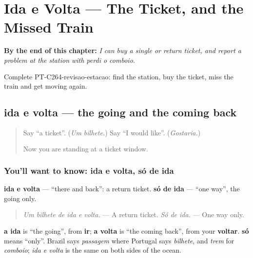 
\chapter{Ida e Volta --- The Ticket, and the Missed Train}
\label{ch:pt-the-ticket-and-the-missed-train}

\begin{chapteropening}
\textbf{By the end of this chapter:} \emph{I can buy a single or return ticket, and report a problem at the station with perdi o comboio.}

Complete PT-C264-revisao-estacao: find the station, buy the ticket, miss the train and get moving again.
\end{chapteropening}

\section[ida e volta, só de ida]{ida e volta — the going and the coming back}

\label{lesson:PT-C264-ida-e-volta}



\begin{quote}
Say \textquotedblleft{}a ticket\textquotedblright{}. (\emph{Um bilhete.}) Say \textquotedblleft{}I would like\textquotedblright{}. (\emph{Gostaria.})

Now you are standing at a ticket window.
\end{quote}

\subsection*{You'll want to know: ida e volta, só de ida}
\textbf{ida e volta} — \textquotedblleft{}there and back\textquotedblright{}: a return ticket. \textbf{só de ida} — \textquotedblleft{}one way\textquotedblright{}, the going only.

\begin{quote}
\emph{Um bilhete de ida e volta.} — A return ticket. \emph{Só de ida.} — One way only.
\end{quote}

\textbf{a ida} is \textquotedblleft{}the going\textquotedblright{}, from \textbf{ir}; \textbf{a volta} is \textquotedblleft{}the coming back\textquotedblright{}, from your \textbf{voltar}. \textbf{só} means \textquotedblleft{}only\textquotedblright{}. Brazil says \emph{passagem} where Portugal says \emph{bilhete}, and \emph{trem} for \emph{comboio}; \emph{ida e volta} is the same on both sides of the ocean.

